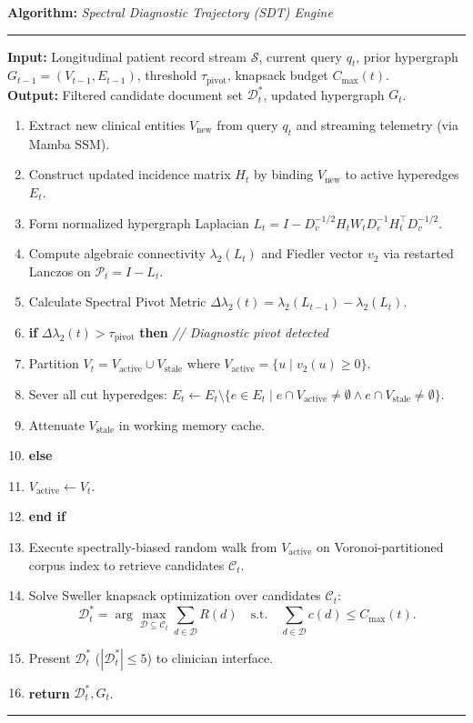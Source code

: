 \documentclass[11pt]{article}
\newenvironment{pseudocode}[1]{%
  \begin{list}{}{\setlength{\leftmargin}{1em}\setlength{\itemsep}{1pt}}
  \item \textbf{Algorithm:} \textit{#1}
  \item \hrule \medskip
}{%
  \vspace{4pt}\hrule
  \end{list}
}
\begin{document}
\begin{pseudocode}{Spectral Diagnostic Trajectory (SDT) Engine}
\textbf{Input:} Longitudinal patient record stream $\mathcal{S}$, current query $q_t$, prior hypergraph $G_{t-1}=(V_{t-1},E_{t-1})$, threshold $\tau_{\text{pivot}}$, knapsack budget $C_{\max}(t)$.\\
\textbf{Output:} Filtered candidate document set $\mathcal{D}^*_t$, updated hypergraph $G_t$.
\begin{enumerate}[1:]
  \item Extract new clinical entities $V_{\text{new}}$ from query $q_t$ and streaming telemetry (via Mamba SSM).
  \item Construct updated incidence matrix $H_t$ by binding $V_{\text{new}}$ to active hyperedges $E_t$.
  \item Form normalized hypergraph Laplacian $L_t = I - D_v^{-1/2} H_t W_t D_e^{-1} H_t^\top D_v^{-1/2}$.
  \item Compute algebraic connectivity $\lambda_2(L_t)$ and Fiedler vector $v_2$ via restarted Lanczos on $\mathcal{P}_t = I - L_t$.
  \item Calculate Spectral Pivot Metric $\Delta \lambda_2(t) = \lambda_2(L_{t-1}) - \lambda_2(L_t)$.
  \item \textbf{if} $\Delta \lambda_2(t) > \tau_{\text{pivot}}$ \textbf{then} \hfill \textit{// Diagnostic pivot detected}
  \item \quad Partition $V_t = V_{\text{active}} \cup V_{\text{stale}}$ where $V_{\text{active}} = \{u \mid v_2(u) \ge 0\}$.
  \item \quad Sever all cut hyperedges: $E_t \leftarrow E_t \setminus \{e \in E_t \mid e \cap V_{\text{active}} \ne \emptyset \land e \cap V_{\text{stale}} \ne \emptyset\}$.
  \item \quad Attenuate $V_{\text{stale}}$ in working memory cache.
  \item \textbf{else}
  \item \quad $V_{\text{active}} \leftarrow V_t$.
  \item \textbf{end if}
  \item Execute spectrally-biased random walk from $V_{\text{active}}$ on Voronoi-partitioned corpus index to retrieve candidates $\mathcal{C}_t$.
  \item Solve Sweller knapsack optimization over candidates $\mathcal{C}_t$:
        $$\mathcal{D}^*_t = \arg\max_{\mathcal{D} \subseteq \mathcal{C}_t} \sum_{d \in \mathcal{D}} R(d) \quad \text{s.t.} \quad \sum_{d \in \mathcal{D}} c(d) \le C_{\max}(t).$$
  \item Present $\mathcal{D}^*_t$ ($|\mathcal{D}^*_t| \le 5$) to clinician interface.
  \item \textbf{return} $\mathcal{D}^*_t, G_t$.
\end{enumerate}
\end{pseudocode}
\end{document}
